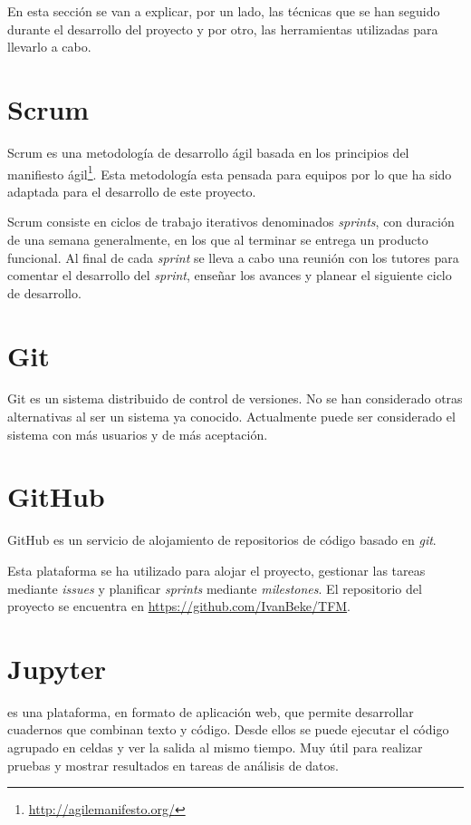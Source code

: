 
En esta sección se van a explicar, por un lado, las técnicas que se han seguido durante el desarrollo del proyecto y por otro, las herramientas utilizadas para llevarlo a cabo.

\section{Scrum}
Scrum es una metodología de desarrollo ágil basada en los principios del manifiesto ágil\footnote{\url{http://agilemanifesto.org/}}. Esta metodología esta pensada para equipos por lo que ha sido adaptada para el desarrollo de este proyecto.

Scrum consiste en ciclos de trabajo iterativos denominados \textit{sprints}, con duración de una semana generalmente, en los que al terminar se entrega un producto funcional. Al final de cada \textit{sprint} se lleva a cabo una reunión con los tutores para comentar el desarrollo del \textit{sprint}, enseñar los avances y planear el siguiente ciclo de desarrollo.

\section{Git}
Git es un sistema distribuido de control de versiones. No se han considerado otras alternativas al ser un sistema ya conocido. Actualmente puede ser considerado el sistema con más usuarios y de más aceptación.

\section{GitHub}
GitHub es un servicio de alojamiento de repositorios de código basado en \textit{git}.

Esta plataforma se ha utilizado para alojar el proyecto, gestionar las tareas mediante \textit{issues} y planificar \textit{sprints} mediante \textit{milestones}. El repositorio del proyecto se encuentra en \url{https://github.com/IvanBeke/TFM}.

\section{Jupyter}
 es una plataforma, en formato de aplicación web, que permite desarrollar cuadernos que combinan texto y código. Desde ellos se puede ejecutar el código agrupado en celdas y ver la salida al mismo tiempo. Muy útil para realizar pruebas y mostrar resultados en tareas de análisis de datos.


